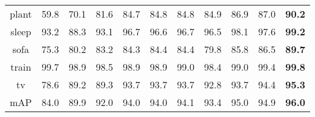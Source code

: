 \documentclass{article} \usepackage{nips14submit_e,times}
\begin{document}
\begin{table*}[t]
{\begin{tabular}{c|cccccccc | cc}
plant & 59.8 & 70.1 & 81.6 & 84.7 & 84.8 & 84.8 & 84.9 & 86.9 & 87.0 & \textbf{90.2} \\
sleep & 93.2 & 88.3 & 93.1 & 96.7 & 96.6 & 96.7 & 96.5 & 98.1 & 97.6 & \textbf{99.2} \\
sofa & 75.3 & 80.2 & 83.2 & 84.3 & 84.4 & 84.4 & 79.8 & 85.8 & 86.5 & \textbf{89.7} \\
train & 99.7 & 98.9 & 98.5 & 98.9 & 98.9 & 99.0 & 98.4 & 99.0 & 99.4 & \textbf{99.8} \\
tv & 78.6 & 89.2 & 89.3 & 93.7 & 93.7 & 93.7 & 92.8 & 93.7 & 94.4 & \textbf{95.3} \\ \hline
mAP & 84.0 & 89.9 & 92.0 & 94.0 & 94.0 & 94.1 & 93.4 & 95.0 & 94.9 & \textbf{96.0} \\
\hline
\end{tabular}}
\end{table*}
\end{document}
